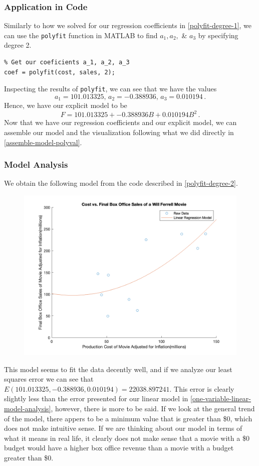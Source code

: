 \documentclass[11pt]{article}
\begin{document}
\subsubsection{Application in Code}
Similarly to how we solved for our regression coefficients in \ref{polyfit-degree-1}, we can use the \texttt{polyfit} function in MATLAB to find $a_1, a_2,$ \& $a_3$ by specifying degree 2.
\label{polyfit-degree-2}
\begin{lstlisting}
% Get our coeficients a_1, a_2, a_3
coef = polyfit(cost, sales, 2);
\end{lstlisting}
Inspecting the results of \texttt{polyfit}, we can see that we have the values
\[ a_1 = 101.013325, \, a_2 = -0.388936, \, a_3 = 0.010194 \, .\]
Hence, we have our explicit model to be
\[ F = 101.013325 + -0.388936 B + 0.010194 B^2 \, .\]
Now that we have our regression coefficients and our explicit model, we can assemble our model and the visualization following what we did directly in \ref{assemble-model-polyval}.

\subsubsection{Model Analysis}
We obtain the following model from the code described in \ref{polyfit-degree-2}.
\begin{figure}[H]
    \centering 
    \label{one-variable-quadratic-plot}
    \includegraphics[width=\textwidth]{models/b.png}
\end{figure}
This model seems to fit the data decently well, and if we analyze our least squares error we can see that $E(101.013325, -0.388936, 0.010194) = 22038.897241$.  
This error is clearly slightly less than the error presented for our linear model in \ref{one-variable-linear-model-analysis}, however, there is more to be said.
If we look at the general trend of the model, there appers to be a minimum value that is greater than \$0, which does not make intuitive sense.  If we are thinking about our model in terms of what it means in real life, it clearly does not make sense that a movie with a \$0 budget would have a higher box office revenue than a movie with a budget greater than \$0. 
\\
\end{document}
